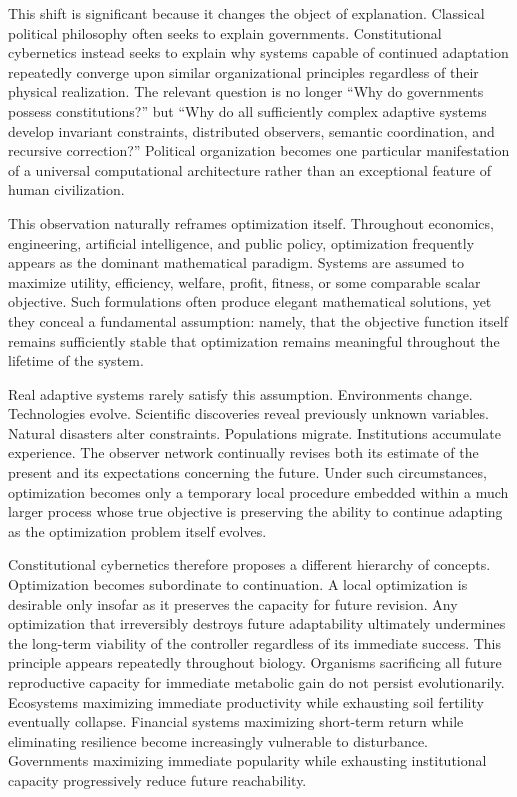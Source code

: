 \documentclass[12pt,a4paper]{article}
\begin{document}
This shift is significant because it changes the object of explanation. Classical political philosophy often seeks to explain governments. Constitutional cybernetics instead seeks to explain why systems capable of continued adaptation repeatedly converge upon similar organizational principles regardless of their physical realization. The relevant question is no longer ``Why do governments possess constitutions?'' but ``Why do all sufficiently complex adaptive systems develop invariant constraints, distributed observers, semantic coordination, and recursive correction?'' Political organization becomes one particular manifestation of a universal computational architecture rather than an exceptional feature of human civilization.

This observation naturally reframes optimization itself. Throughout economics, engineering, artificial intelligence, and public policy, optimization frequently appears as the dominant mathematical paradigm. Systems are assumed to maximize utility, efficiency, welfare, profit, fitness, or some comparable scalar objective. Such formulations often produce elegant mathematical solutions, yet they conceal a fundamental assumption: namely, that the objective function itself remains sufficiently stable that optimization remains meaningful throughout the lifetime of the system.

Real adaptive systems rarely satisfy this assumption. Environments change. Technologies evolve. Scientific discoveries reveal previously unknown variables. Natural disasters alter constraints. Populations migrate. Institutions accumulate experience. The observer network continually revises both its estimate of the present and its expectations concerning the future. Under such circumstances, optimization becomes only a temporary local procedure embedded within a much larger process whose true objective is preserving the ability to continue adapting as the optimization problem itself evolves.

Constitutional cybernetics therefore proposes a different hierarchy of concepts. Optimization becomes subordinate to continuation. A local optimization is desirable only insofar as it preserves the capacity for future revision. Any optimization that irreversibly destroys future adaptability ultimately undermines the long-term viability of the controller regardless of its immediate success. This principle appears repeatedly throughout biology. Organisms sacrificing all future reproductive capacity for immediate metabolic gain do not persist evolutionarily. Ecosystems maximizing immediate productivity while exhausting soil fertility eventually collapse. Financial systems maximizing short-term return while eliminating resilience become increasingly vulnerable to disturbance. Governments maximizing immediate popularity while exhausting institutional capacity progressively reduce future reachability.
\end{document}
